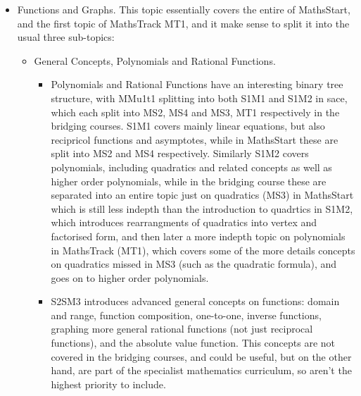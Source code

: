 \documentclass[twoside,12pt,a4paper]{report}
\begin{document}
\begin{itemize}
	\item Functions and Graphs. This topic essentially covers the entire of MathsStart, and the first topic of MathsTrack MT1, and it make sense to split it into the usual three sub-topics:
		\begin{itemize} 
			\item General Concepts, Polynomials and Rational Functions. 
				\begin{itemize}
					\item Polynomials and Rational Functions have an interesting binary tree structure, with MMu1t1 splitting into both S1M1 and S1M2 in \gls{sace}, which each split into MS2, MS4 and MS3, MT1 respectively in the bridging courses. S1M1 covers mainly linear equations, but also recipricol functions and asymptotes, while in MathsStart these are split into MS2 and MS4 respectively. Similarly S1M2 covers polynomials, including quadratics and related concepts as well as higher order polynomials, while in the bridging course these are separated into an entire topic just on quadratics (MS3) in MathsStart which is still less indepth than the introduction to quadrtics in S1M2, which introduces rearrangments of quadratics into vertex and factorised form, and then later a more indepth topic on polynomials in MathsTrack (MT1), which covers some of the more details concepts on quadratics missed in MS3 (such as the quadratic formula), and goes on to higher order polynomials. 
					\item S2SM3 introduces advanced general concepts on functions: domain and range, function composition, one-to-one, inverse functions, graphing more general rational functions (not just reciprocal functions), and the absolute value function. This concepts are not covered in the bridging courses, and could be useful, but on the other hand, are part of the specialist mathematics curriculum, so aren't the highest priority to include.
				\end{itemize}

\end{itemize}
\end{itemize}
\end{document}
